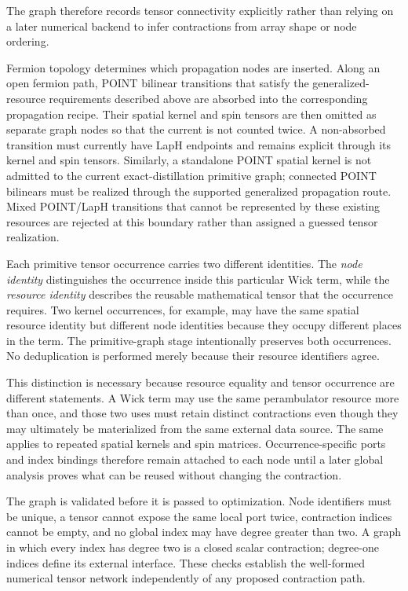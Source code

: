 \documentclass[11pt]{article}
\begin{document}
The graph therefore records tensor connectivity explicitly rather than relying
on a later numerical backend to infer contractions from array shape or node
ordering.

Fermion topology determines which propagation nodes are inserted. Along an open
fermion path, POINT bilinear transitions that satisfy the generalized-resource
requirements described above are absorbed into the corresponding propagation
recipe. Their spatial kernel and spin tensors are then omitted as separate graph
nodes so that the current is not counted twice. A non-absorbed transition must
currently have LapH endpoints and remains explicit through its kernel and spin
tensors. Similarly, a standalone POINT spatial kernel is not admitted to the
current exact-distillation primitive graph; connected POINT bilinears must be
realized through the supported generalized propagation route. Mixed POINT/LapH
transitions that cannot be represented by these existing resources are rejected
at this boundary rather than assigned a guessed tensor realization.

Each primitive tensor occurrence carries two different identities. The
\emph{node identity} distinguishes the occurrence inside this particular Wick
term, while the \emph{resource identity} describes the reusable mathematical
tensor that the occurrence requires. Two kernel occurrences, for example, may
have the same spatial resource identity but different node identities because
they occupy different places in the term. The primitive-graph stage
intentionally preserves both occurrences. No deduplication is performed merely
because their resource identifiers agree.

This distinction is necessary because resource equality and tensor occurrence
are different statements. A Wick term may use the same perambulator resource
more than once, and those two uses must retain distinct contractions even though
they may ultimately be materialized from the same external data source. The
same applies to repeated spatial kernels and spin matrices. Occurrence-specific
ports and index bindings therefore remain attached to each node until a later
global analysis proves what can be reused without changing the contraction.

The graph is validated before it is passed to optimization. Node identifiers
must be unique, a tensor cannot expose the same local port twice, contraction
indices cannot be empty, and no global index may have degree greater than two.
A graph in which every index has degree two is a closed scalar contraction;
degree-one indices define its external interface. These checks establish the
well-formed numerical tensor network independently of any proposed contraction
path.
\end{document}
